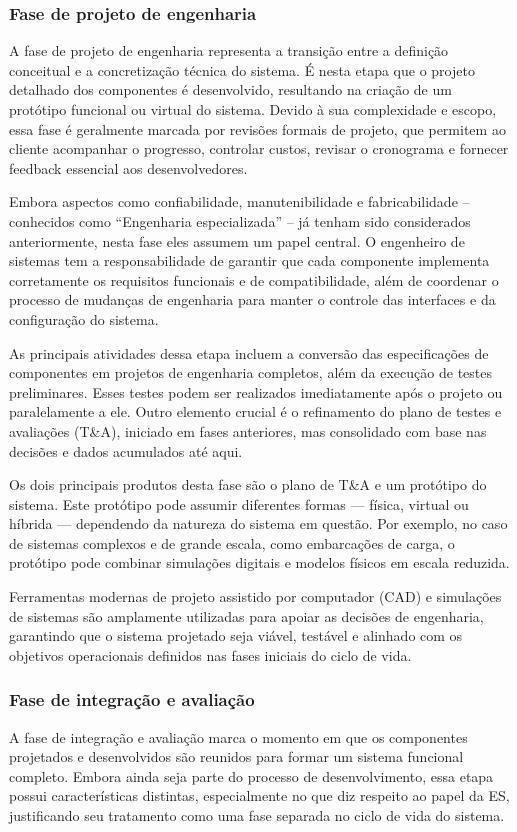 	\subsubsection*{Fase de projeto de engenharia}

	A fase de projeto de engenharia representa a transição entre a definição conceitual e a concretização técnica do sistema. É nesta etapa que o projeto detalhado 
	dos componentes é desenvolvido, resultando na criação de um protótipo funcional ou virtual do sistema. Devido à sua complexidade e escopo, essa fase é geralmente
	marcada por revisões formais de projeto, que permitem ao cliente acompanhar o progresso, controlar custos, revisar o cronograma e fornecer feedback essencial 
	aos desenvolvedores.

	Embora aspectos como confiabilidade, manutenibilidade e fabricabilidade – conhecidos como ``Engenharia especializada'' – já tenham sido considerados anteriormente, 
	nesta fase eles assumem um papel central. O engenheiro de sistemas tem a responsabilidade de garantir que cada componente implementa corretamente os requisitos 
	funcionais e de compatibilidade, além de coordenar o processo de mudanças de engenharia para manter o controle das interfaces e da configuração do sistema.

	As principais atividades dessa etapa incluem a conversão das especificações de componentes em projetos de engenharia completos, além da execução de testes 
	preliminares. Esses testes podem ser realizados imediatamente após o projeto ou paralelamente a ele. Outro elemento crucial é o refinamento do plano de testes e 
	avaliações (T\&A), iniciado em fases anteriores, mas consolidado com base nas decisões e dados acumulados até aqui.

	Os dois principais produtos desta fase são o plano de T\&A e um protótipo do sistema. Este protótipo pode assumir diferentes formas — física, virtual ou híbrida — 
	dependendo da natureza do sistema em questão. Por exemplo, no caso de sistemas complexos e de grande escala, como embarcações de carga, o protótipo pode combinar
	simulações digitais e modelos físicos em escala reduzida.

	Ferramentas modernas de projeto assistido por computador (CAD) e simulações de sistemas são amplamente utilizadas para apoiar as decisões de engenharia, 
	garantindo que o sistema projetado seja viável, testável e alinhado com os objetivos operacionais definidos nas fases iniciais do ciclo de vida.

	\subsubsection*{Fase de integração e avaliação}
	A fase de integração e avaliação marca o momento em que os componentes projetados e desenvolvidos são reunidos para formar um sistema funcional completo. 
	Embora ainda seja parte do processo de desenvolvimento, essa etapa possui características distintas, especialmente no que diz respeito ao papel da ES, 
	justificando seu tratamento como uma fase separada no ciclo de vida do sistema.


